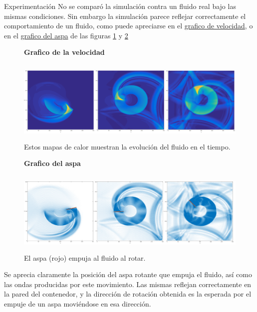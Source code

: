 
\begin{section}{Experimentación}
 No se comparó la simulación contra un fluido real bajo las mismas condiciones. Sin embargo la simulación parece reflejar correctamente el comportamiento de un fluido, como puede apreciarse en el \href{https://www.youtube.com/watch?v=D8JOELu8uAs}{grafico de velocidad}, o en el \href{https://www.youtube.com/watch?v=_JisfmOIEdU}{grafico del aspa} de las figuras \ref{fig:sim_hm_all} y \ref{fig:sim_vf_all}
~\\
\begin{figure}
    \textbf{Grafico de la velocidad}\par\medskip

\includegraphics[width=\textwidth,height=4cm]{figures/sim_hm_all}
\caption{Estos mapas de calor muestran la evolución del fluido en el tiempo.}
\label{fig:sim_hm_all}
\end{figure}

\begin{figure}
    \textbf{Grafico del aspa}\par\medskip

\includegraphics[width=\textwidth,height=4cm]{figures/sim_vf_all}
\caption{El aspa (rojo) empuja al fluido al rotar.}
\label{fig:sim_vf_all}
\end{figure}

Se aprecia claramente la posición del aspa rotante que empuja el fluido, así como las ondas producidas por este movimiento. Las mismas reflejan correctamente en la pared del contenedor, y la dirección de rotación obtenida es la esperada por el empuje de un aspa moviéndose en esa dirección.


\end{section}
